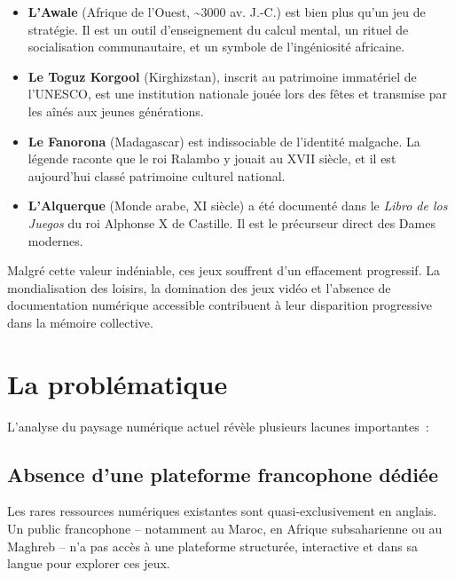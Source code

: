 \begin{itemize}
    \item \textbf{L'Awale} (Afrique de l'Ouest, \textasciitilde 3000 av. J.-C.) est bien plus
          qu'un jeu de stratégie. Il est un outil d'enseignement du calcul mental, un rituel de
          socialisation communautaire, et un symbole de l'ingéniosité africaine.

    \item \textbf{Le Toguz Korgool} (Kirghizstan), inscrit au patrimoine immatériel de l'UNESCO,
          est une institution nationale jouée lors des fêtes et transmise par les aînés aux jeunes
          générations.

    \item \textbf{Le Fanorona} (Madagascar) est indissociable de l'identité malgache. La légende
          raconte que le roi Ralambo y jouait au XVII\ieme{} siècle, et il est aujourd'hui classé
          patrimoine culturel national.

    \item \textbf{L'Alquerque} (Monde arabe, XI\ieme{} siècle) a été documenté dans le
          \textit{Libro de los Juegos} du roi Alphonse X de Castille. Il est le précurseur direct
          des Dames modernes.
\end{itemize}

Malgré cette valeur indéniable, ces jeux souffrent d'un effacement progressif. La mondialisation
des loisirs, la domination des jeux vidéo et l'absence de documentation numérique accessible
contribuent à leur disparition progressive dans la mémoire collective.

\section{La problématique}

L'analyse du paysage numérique actuel révèle plusieurs lacunes importantes~:

\subsection{Absence d'une plateforme francophone dédiée}

Les rares ressources numériques existantes sont quasi-exclusivement en anglais. Un public
francophone -- notamment au Maroc, en Afrique subsaharienne ou au Maghreb -- n'a pas accès à
une plateforme structurée, interactive et dans sa langue pour explorer ces jeux.

